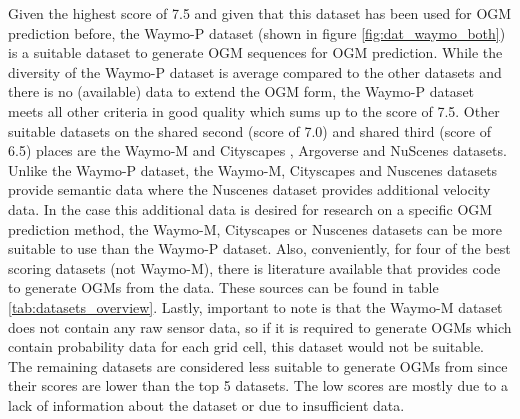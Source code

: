 Given the highest score of 7.5 and given that this dataset has been used for \gls{OGM} prediction before, the Waymo-P \cite{sun2020scalability} dataset (shown in figure \ref{fig:dat_waymo_both}) is a suitable dataset to generate \gls{OGM} sequences for \gls{OGM} prediction. While the diversity of the Waymo-P dataset is average compared to the other datasets and there is no (available) data to extend the \gls{OGM} form, the Waymo-P dataset meets all other criteria in good quality which sums up to the score of 7.5. Other suitable datasets on the shared second (score of 7.0) and shared third (score of 6.5) places are the Waymo-M \cite{ettinger2021large} and Cityscapes \cite{cordts2016cityscapes}, Argoverse \cite{chang2019argoverse} and NuScenes \cite{caesar2020nuscenes} datasets. Unlike the Waymo-P dataset, the Waymo-M, Cityscapes and Nuscenes datasets provide semantic data where the Nuscenes dataset provides additional velocity data. In the case this additional data is desired for research on a specific \gls{OGM} prediction method, the Waymo-M, Cityscapes or Nuscenes datasets can be more suitable to use than the Waymo-P dataset. Also, conveniently, for four of the best scoring datasets (not Waymo-M), there is literature available that provides code to generate \glspl{OGM} from the data. These sources can be found in table \ref{tab:datasets_overview}. Lastly, important to note is that the Waymo-M dataset does not contain any raw sensor data, so if it is required to generate \glspl{OGM} which contain probability data for each grid cell, this dataset would not be suitable. The remaining datasets are considered less suitable to generate \glspl{OGM} from since their scores are lower than the top 5 datasets. The low scores are mostly due to a lack of information about the dataset or due to insufficient data.

